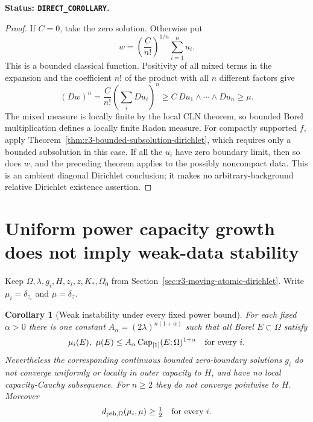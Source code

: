 \documentclass[11pt,a4paper]{article}
\numberwithin{equation}{section}
\newtheorem{corollary}[theorem]{Corollary}
\theoremstyle{definition}
\theoremstyle{remark}
\begin{document}
\noindent\textbf{Status: \texttt{DIRECT\_COROLLARY}.}

\begin{proof}
If $C=0$, take the zero solution. Otherwise put
\[
 w=\left(\frac{C}{n!}\right)^{1/n}\sum_{i=1}^n u_i.
\]
This is a bounded classical function. Positivity of all mixed
terms in the expansion and the coefficient $n!$ of the product
with all $n$ different factors give
\[
 (Dw)^n
  =\frac{C}{n!}\left(\sum_i Du_i\right)^n
  \geq C\,Du_1\wedge\cdots\wedge Du_n\geq\mu.
\]
The mixed measure is locally finite by the local CLN theorem, so
bounded Borel multiplication defines a locally finite Radon measure.
For compactly supported $f$, apply
Theorem~\ref{thm:r3-bounded-subsolution-dirichlet}, which requires
only a bounded subsolution in this case. If all the $u_i$ have
zero boundary limit, then so does $w$, and the preceding theorem
applies to the possibly noncompact data. This is an ambient
diagonal Dirichlet conclusion; it makes no arbitrary-background
relative Dirichlet existence assertion.
\end{proof}



\section{Uniform power capacity growth does not imply weak-data stability}
\label{sec:r3-capacity-growth-instability}

Keep $\Omega,\lambda,g_i,H,z_i,z,K_*,\Omega_0$ from
Section~\ref{sec:r3-moving-atomic-dirichlet}. Write
$\mu_i=\delta_{z_i}$ and $\mu=\delta_z$.

\begin{corollary}[Weak instability under every fixed power bound]
\label{cor:r3-power-capacity-weak-instability}
For each fixed $\alpha>0$ there is one constant
$A_\alpha=(2\lambda)^{n(1+\alpha)}$ such that all Borel
$E\subset\Omega$ satisfy
\begin{equation}
 \mu_i(E),\ \mu(E)
       \leq A_\alpha\operatorname{Cap}_{[1]}(E;\Omega)^{1+\alpha}
       \quad\hbox{for every }i.
 \label{eq:r3-common-power-capacity-bound}
\end{equation}
Nevertheless the corresponding continuous bounded zero-boundary
solutions $g_i$ do not converge uniformly or locally in outer
capacity to $H$, and have no local capacity-Cauchy subsequence.
For $n\geq2$ they do not converge pointwise to $H$.
Moreover
\[
 d_{\mathrm{psh},\Omega}(\mu_i,\mu)\geq\tfrac12
 \quad\hbox{for every }i .
\]
\end{corollary}
\end{document}
